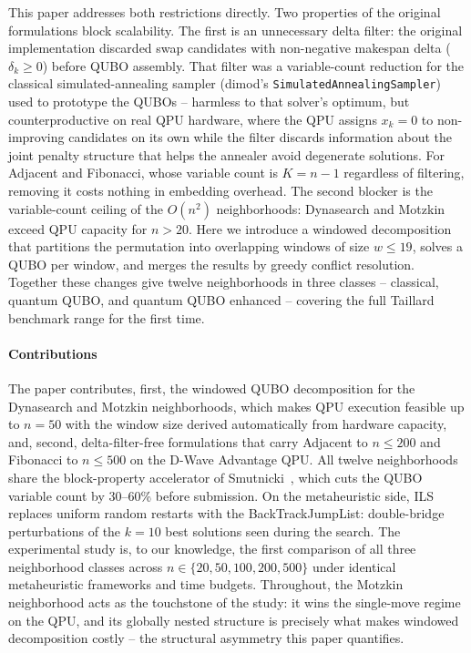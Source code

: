 \documentclass[preprint,12pt,authoryear]{elsarticle}
\begin{document}
This paper addresses both restrictions directly. Two properties of the
original formulations block scalability. The first is an unnecessary
delta filter: the original implementation discarded swap candidates
with non-negative makespan delta ($\delta_k \geq 0$) before QUBO
assembly. That filter was a variable-count reduction for the classical
simulated-annealing sampler (dimod's \texttt{SimulatedAnnealingSampler})
used to prototype the QUBOs -- harmless to that solver's optimum, but
counterproductive on real QPU hardware, where the QPU assigns
$x_k = 0$ to non-improving candidates on its own while the filter
discards information about the joint penalty structure that helps the
annealer avoid degenerate solutions. For Adjacent and Fibonacci, whose
variable count is $K = n - 1$ regardless of filtering, removing it
costs nothing in embedding overhead. The second blocker is the
variable-count ceiling of the $O(n^2)$ neighborhoods: Dynasearch and
Motzkin exceed QPU capacity for $n > 20$. Here we introduce a windowed
decomposition that partitions the permutation into overlapping windows
of size $w \leq 19$, solves a QUBO per window, and merges the results
by greedy conflict resolution. Together these changes give twelve
neighborhoods in three classes -- classical, quantum QUBO, and
quantum QUBO enhanced -- covering the full Taillard benchmark range
for the first time.

\paragraph{Contributions}
The paper contributes, first, the windowed QUBO decomposition for the
Dynasearch and Motzkin neighborhoods, which makes QPU execution
feasible up to $n = 50$ with the window size derived automatically
from hardware capacity, and, second, delta-filter-free formulations
that carry Adjacent to $n \leq 200$ and Fibonacci to $n \leq 500$ on
the D-Wave Advantage QPU. All twelve neighborhoods share the block-property
accelerator of Smutnicki~\citep{ref_smutnicki}, which cuts the QUBO
variable count by 30--60\% before submission. On the metaheuristic
side, ILS replaces uniform random restarts with the BackTrackJumpList:
double-bridge perturbations of the $k = 10$ best solutions seen during
the search. The experimental study is, to our knowledge, the first
comparison of all three neighborhood classes across
$n \in \{20, 50, 100, 200, 500\}$ under identical metaheuristic
frameworks and time budgets. Throughout, the Motzkin neighborhood acts
as the touchstone of the study: it wins the single-move regime on the
QPU, and its globally nested structure is precisely what makes
windowed decomposition costly -- the structural asymmetry this paper
quantifies.
\end{document}
